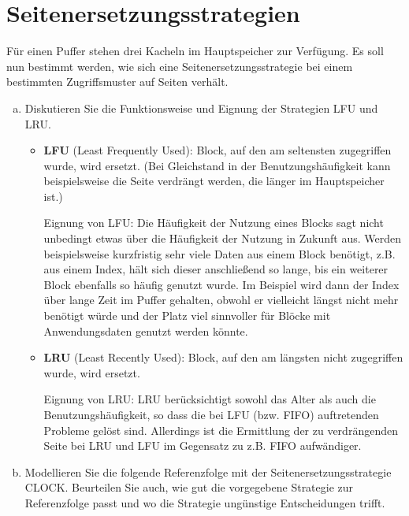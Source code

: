 \section{Seitenersetzungsstrategien}\label{Seiten}
Für einen Puffer stehen drei Kacheln im Hauptspeicher zur Verfügung.
Es soll nun bestimmt werden, wie sich eine Seitenersetzungsstrategie bei einem bestimmten Zugriffsmuster auf Seiten verhält.

\begin{enumerate}[a)]
    \item Diskutieren Sie die Funktionsweise und Eignung der Strategien LFU und LRU.
\begin{solution}
    \begin{itemize}
        \item \textbf{LFU} (Least Frequently Used):
					Block, auf den am seltensten zugegriffen wurde, wird ersetzt.
					(Bei Gleichstand in der Benutzungshäufigkeit kann beispielsweise die Seite verdrängt werden, die länger im Hauptspeicher ist.)

            Eignung von LFU: Die Häufigkeit der Nutzung eines Blocks sagt nicht unbedingt etwas über die Häufigkeit der Nutzung in Zukunft aus.
            Werden beispielsweise kurzfristig sehr viele Daten aus einem Block benötigt, z.B. aus einem Index, hält sich dieser anschließend so lange, bis ein weiterer Block ebenfalls so häufig genutzt wurde.
            Im Beispiel wird dann der Index über lange Zeit im Puffer gehalten, obwohl er vielleicht längst nicht mehr benötigt würde und der Platz viel sinnvoller für Blöcke mit Anwendungsdaten genutzt werden könnte.

        \item \textbf{LRU} (Least Recently Used):
            Block, auf den am längsten nicht zugegriffen wurde, wird ersetzt.

            Eignung von LRU: LRU berücksichtigt sowohl das Alter als auch die Benutzungshäufigkeit, so dass die bei LFU (bzw. FIFO) auftretenden Probleme gelöst sind.
			Allerdings ist die Ermittlung der zu verdrängenden Seite bei LRU und LFU im Gegensatz zu z.B. FIFO aufwändiger.
    \end{itemize}

\end{solution}
\beamertxt{\pagebreak}

	\item
Modellieren Sie die folgende Referenzfolge mit der Seitenersetzungsstrategie CLOCK.
Beurteilen Sie auch, wie gut die vorgegebene Strategie zur Referenzfolge passt und wo die Strategie ungünstige Entscheidungen trifft.


\end{enumerate}
